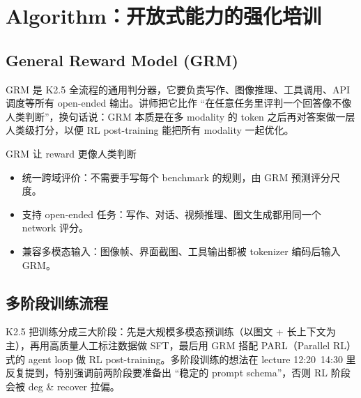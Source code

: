 \section{Algorithm：开放式能力的强化培训}

\subsection{General Reward Model (GRM)}
GRM 是 K2.5 全流程的通用判分器，它要负责写作、图像推理、工具调用、API 调度等所有 open-ended 输出。讲师把它比作 ``在任意任务里评判一个回答像不像人类判断''，换句话说：GRM 本质是在多 modality 的 token 之后再对答案做一层人类级打分，以便 RL post-training 能把所有 modality 一起优化。

\begin{knowledgebox}{GRM 让 reward 更像人类判断}
\begin{itemize}
    \item 统一跨域评价：不需要手写每个 benchmark 的规则，由 GRM 预测评分尺度。
    \item 支持 open-ended 任务：写作、对话、视频推理、图文生成都用同一个 network 评分。
    \item 兼容多模态输入：图像帧、界面截图、工具输出都被 tokenizer 编码后输入 GRM。
\end{itemize}
\end{knowledgebox}

\subsection{多阶段训练流程}
K2.5 把训练分成三大阶段：先是大规模多模态预训练（以图文 + 长上下文为主），再用高质量人工标注数据做 SFT，最后用 GRM 搭配 PARL（Parallel RL）式的 agent loop 做 RL post-training。多阶段训练的想法在 lecture 12:20~14:30 里反复提到，特别强调前两阶段要准备出 ``稳定的 prompt schema''，否则 RL 阶段会被 deg \& recover 拉偏。

